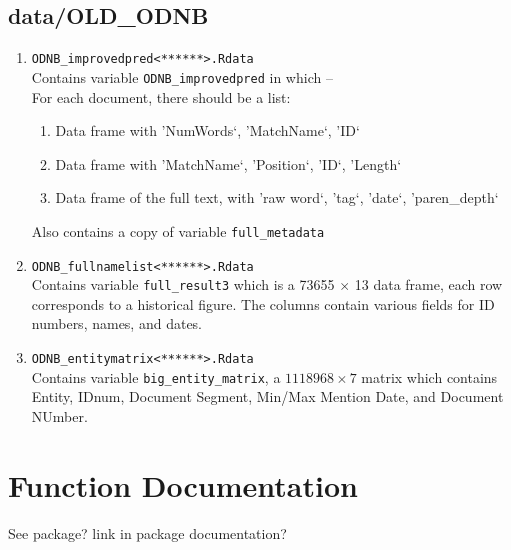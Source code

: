 \documentclass[11pt]{article}
\newcommand{\filename}[1]{\texttt{#1}}
\begin{document}
\subsection{data/OLD\_ODNB}
\begin{enumerate}
\item \filename{ODNB\_improvedpred<******>.Rdata} \\
Contains variable \texttt{ODNB\_improvedpred} in which -- \\
For each document, there should be a list: 
\begin{enumerate}
\item Data frame with 'NumWords`, 'MatchName`, 'ID`
\item Data frame with 'MatchName`, 'Position`, 'ID`, 'Length`
\item Data frame of the full text, with 'raw word`, 'tag`, 'date`, 'paren\_depth`
\end{enumerate} 
Also contains a copy of variable \texttt{full\_metadata}

\item \filename{ODNB\_fullnamelist<******>.Rdata} \\
Contains variable \texttt{full\_result3} which is a 73655 $\times$ 13 data frame, each row corresponds to a historical figure. The columns contain various fields for ID numbers, names, and dates. 

\item \filename{ODNB\_entitymatrix<******>.Rdata} \\
Contains variable \texttt{big\_entity\_matrix}, a $1118968 \times 7$ matrix which contains Entity, IDnum, Document Segment, Min/Max Mention Date, and Document NUmber. 

\end{enumerate}


\section{Function Documentation}
See package? link in package documentation?
\end{document}
